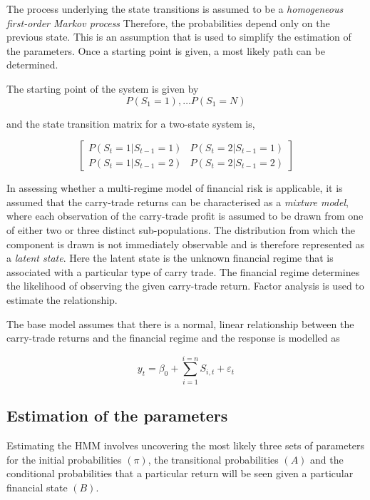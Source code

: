 \documentclass[12pt, a4paper, oneside]{article} %
\begin{document}
The process underlying the state transitions is assumed to be a \emph{homogeneous first-order Markov process}  Therefore, the probabilities depend only on the previous state. This is an assumption that is used to simplify the estimation of the parameters. Once a starting point is given, a most likely path can be determined. 


The starting point of the system is given by
\begin{equation*}
P(S_1 = 1), \dots P(S_1 = N)
\end{equation*}

and the state transition matrix for a two-state system is, 

\begin{equation*}
\begin{bmatrix}
P(S_t = 1|S_{t-1}=1)  & P(S_t = 2|S_{t-1}=1)\\
P(S_t = 1|S_{t-1}=2)  & P(S_t = 2|S_{t-1}=2)
\end{bmatrix}
\end{equation*}



In assessing whether a multi-regime model of financial risk is applicable, it is assumed that the carry-trade returns can be characterised as a \emph{mixture model}, where each observation of the carry-trade profit is assumed to be drawn from one of either two or three distinct sub-populations.   The distribution from which the component is drawn is not immediately observable and is therefore represented as a \emph{latent state}.  Here the latent state is the unknown financial regime that is associated with a particular type of carry trade.  The financial regime determines the likelihood of observing the given carry-trade return.  Factor analysis is used to estimate the relationship. 

The base model assumes that there is a normal, linear relationship between the carry-trade returns and the financial regime and the response is modelled as 

\begin{equation}
y_t = \beta_0 + \sum_{i=1}^{i=n}S_{i,t} + \varepsilon_t
\end{equation}

\subsection{Estimation of the parameters}
Estimating the HMM involves uncovering the most likely three sets of parameters for the initial probabilities $(\pi)$, the transitional probabilities $(A)$ and the conditional probabilities that a particular return will be seen given a particular financial state $(B)$.
\end{document}
